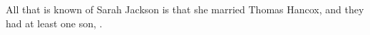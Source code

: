 
All that is known of Sarah Jackson is that she married Thomas Hancox, and they had at least one son, .
